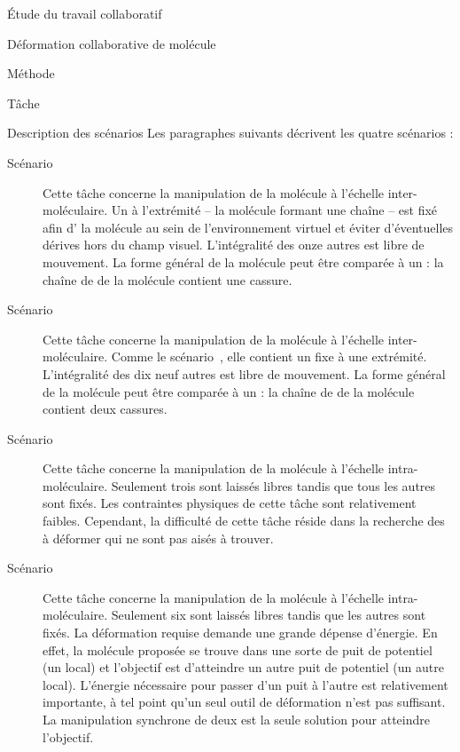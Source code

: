\documentclass[myfrancais]{mythesis}
\begin{document}
\begin{mypart}{Étude du travail collaboratif}
\begin{mychapter}{Déformation collaborative de molécule}
\begin{mysection}{Méthode}
\begin{mysubsection}{Tâche}
\begin{mysubsubsection}{Description des scénarios}
						Les paragraphes suivants décrivent les quatre scénarios :
						\begin{description}
							\item[Scénario~]
								Cette tâche concerne la manipulation de la molécule \myTRPZIPPER à l'échelle inter-moléculaire.
								Un  à l'extrémité -- la molécule formant une chaîne -- est fixé afin d' la molécule au sein de l'environnement virtuel et éviter d'éventuelles dérives hors du champ visuel.
								L'intégralité des onze autres  est libre de mouvement.
								La forme général de la molécule peut être comparée à un  : la chaîne de  de la molécule contient une cassure.
							\item[Scénario~]
								Cette tâche concerne la manipulation de la molécule \myTRPCAGE à l'échelle inter-moléculaire.
								Comme le scénario~, elle contient un  fixe à une extrémité.
								L'intégralité des dix neuf autres  est libre de mouvement.
								La forme général de la molécule peut être comparée à un  : la chaîne de  de la molécule contient deux cassures.
							\item[Scénario~]
								Cette tâche concerne la manipulation de la molécule \myTRPZIPPER à l'échelle intra-moléculaire.
								Seulement trois  sont laissés libres tandis que tous les autres sont fixés.
								Les contraintes physiques de cette tâche sont relativement faibles.
								Cependant, la difficulté de cette tâche réside dans la recherche des  à déformer qui ne sont pas aisés à trouver.
							\item[Scénario~]
								Cette tâche concerne la manipulation de la molécule \myTRPCAGE à l'échelle intra-moléculaire.
								Seulement six  sont laissés libres tandis que les autres sont fixés.
								La déformation requise demande une grande dépense d'énergie.
								En effet, la molécule proposée se trouve dans une sorte de puit de potentiel (un  local) et l'objectif est d'atteindre un autre puit de potentiel (un autre  local).
								L'énergie nécessaire pour passer d'un puit à l'autre est relativement importante, à tel point qu'un seul outil de déformation n'est pas suffisant.
								La manipulation synchrone de deux  est la seule solution pour atteindre l'objectif.
						\end{description}


\end{mysubsubsection}
\end{mysubsection}
\end{mysection}
\end{mychapter}
\end{mypart}
\end{document}
